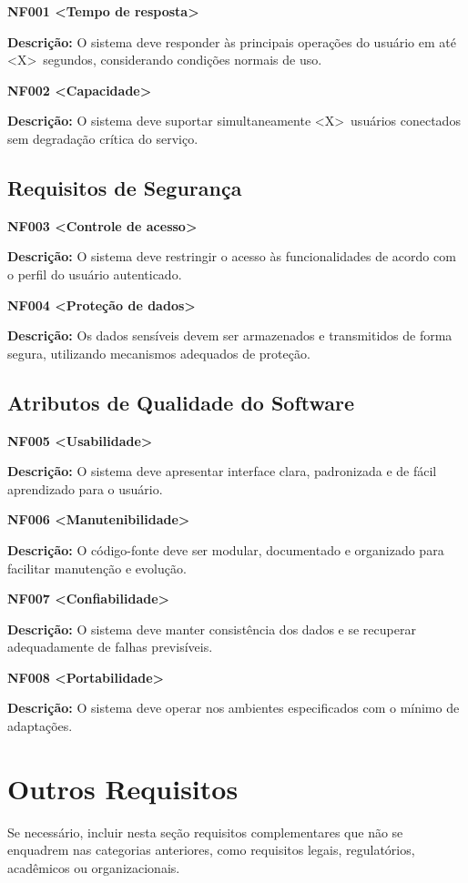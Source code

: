 \documentclass[12pt,a4paper]{article}
\newcommand{\blocoNF}[3]{
\noindent\textbf{#1 \textless #2\textgreater}

\vspace{0.2cm}
\noindent\textbf{Descrição:} #3

\vspace{0.4cm}
}
\begin{document}
\blocoNF
{NF001}
{Tempo de resposta}
{O sistema deve responder às principais operações do usuário em até \textless X\textgreater\ segundos, considerando condições normais de uso.}

\blocoNF
{NF002}
{Capacidade}
{O sistema deve suportar simultaneamente \textless X\textgreater\ usuários conectados sem degradação crítica do serviço.}

\subsection{Requisitos de Segurança}

\blocoNF
{NF003}
{Controle de acesso}
{O sistema deve restringir o acesso às funcionalidades de acordo com o perfil do usuário autenticado.}

\blocoNF
{NF004}
{Proteção de dados}
{Os dados sensíveis devem ser armazenados e transmitidos de forma segura, utilizando mecanismos adequados de proteção.}

\subsection{Atributos de Qualidade do Software}

\blocoNF
{NF005}
{Usabilidade}
{O sistema deve apresentar interface clara, padronizada e de fácil aprendizado para o usuário.}

\blocoNF
{NF006}
{Manutenibilidade}
{O código-fonte deve ser modular, documentado e organizado para facilitar manutenção e evolução.}

\blocoNF
{NF007}
{Confiabilidade}
{O sistema deve manter consistência dos dados e se recuperar adequadamente de falhas previsíveis.}

\blocoNF
{NF008}
{Portabilidade}
{O sistema deve operar nos ambientes especificados com o mínimo de adaptações.}

\section{Outros Requisitos}
Se necessário, incluir nesta seção requisitos complementares que não se enquadrem nas categorias anteriores, como requisitos legais, regulatórios, acadêmicos ou organizacionais.

\vfill
\end{document}
